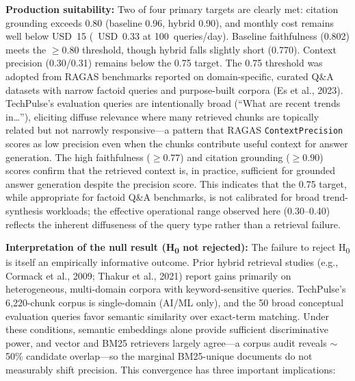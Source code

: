 \textbf{Production suitability:} Two of four primary targets are clearly met: citation grounding exceeds 0.80 (baseline 0.96, hybrid 0.90), and monthly cost remains well below USD~15 (~USD~0.33 at 100~queries/day). Baseline faithfulness (0.802) meets the $\geq 0.80$ threshold, though hybrid falls slightly short (0.770). Context precision (0.30/0.31) remains below the 0.75 target. The 0.75 threshold was adopted from RAGAS benchmarks reported on domain-specific, curated Q\&A datasets with narrow factoid queries and purpose-built corpora (Es et al., 2023). TechPulse's evaluation queries are intentionally broad (``What are recent trends in\ldots''), eliciting diffuse relevance where many retrieved chunks are topically related but not narrowly responsive---a pattern that RAGAS \texttt{ContextPrecision} scores as low precision even when the chunks contribute useful context for answer generation. The high faithfulness ($\geq 0.77$) and citation grounding ($\geq 0.90$) scores confirm that the retrieved context is, in practice, sufficient for grounded answer generation despite the precision score. This indicates that the 0.75 target, while appropriate for factoid Q\&A benchmarks, is not calibrated for broad trend-synthesis workloads; the effective operational range observed here (0.30--0.40) reflects the inherent diffuseness of the query type rather than a retrieval failure.

\textbf{Interpretation of the null result (H\textsubscript{0} not rejected):} The failure to reject H\textsubscript{0} is itself an empirically informative outcome. Prior hybrid retrieval studies (e.g., Cormack et al., 2009; Thakur et al., 2021) report gains primarily on heterogeneous, multi-domain corpora with keyword-sensitive queries. TechPulse's 6{,}220-chunk corpus is single-domain (AI/ML only), and the 50 broad conceptual evaluation queries favor semantic similarity over exact-term matching. Under these conditions, semantic embeddings alone provide sufficient discriminative power, and vector and BM25 retrievers largely agree---a corpus audit reveals $\sim$50\% candidate overlap---so the marginal BM25-unique documents do not measurably shift precision. This convergence has three important implications:


